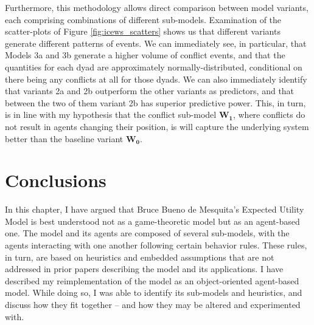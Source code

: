 Furthermore, this methodology allows direct comparison between model variants, each comprising combinations of different sub-models. Examination of the scatter-plots of Figure \ref{fig:icews_scatters} shows us that different variants generate different patterns of events. We can immediately see, in particular, that Models 3a and 3b generate a higher volume of conflict events, and that the quantities for each dyad are approximately normally-distributed, conditional on there being any conflicts at all for those dyads. We can also immediately identify that variants 2a and 2b outperform the other variants as predictors, and that between the two of them variant 2b has superior predictive power. This, in turn, is in line with my hypothesis that the conflict sub-model $\mathbf{W_1}$, where conflicts do not result in agents changing their position, is will capture the underlying system better than the baseline variant $\mathbf{W_0}$.

\section{Conclusions}

In this chapter, I have argued that Bruce Bueno de Mesquita's Expected Utility Model is best understood not as a game-theoretic model but as an agent-based one. The model and its agents are composed of several sub-models, with the agents interacting with one another following certain behavior rules. These rules, in turn, are based on heuristics and embedded assumptions that are not addressed in prior papers describing the model and its applications. I have described my reimplementation of the model as an object-oriented agent-based model. While doing so, I was able to identify its sub-models and heuristics, and discuss how they fit together -- and how they may be altered and experimented with.

